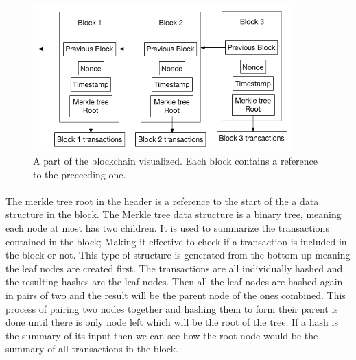 \documentclass[informationsecurity]{gucmasterproject}
\begin{document}
\begin{figure}[h]
    \centering
    \includegraphics[width=10cm]{blockchain.png}
    \caption{A part of the blockchain visualized. Each block contains a reference to the preceeding one.}
    \label{fig:blockchain}
\end{figure}


\paragraph{}
The merkle tree root in the header is a reference to the start of the a data structure in the block. The Merkle tree data structure is a binary tree, meaning each node at most has two children. It is used to summarize the transactions contained in the block; Making it effective to check if a transaction is included in the block or not. This type of structure is generated from the bottom up meaning the leaf nodes are created first. The transactions are all individually hashed and the resulting hashes are the leaf nodes. Then all the leaf nodes are hashed again in pairs of two and the result will be the parent node of the ones combined. This process of pairing two nodes together and hashing them to form their parent is done until there is only node left which will be the root of the tree. If a hash is the summary of its input then we can see how the root node would be the summary of all transactions in the block.
\end{document}
